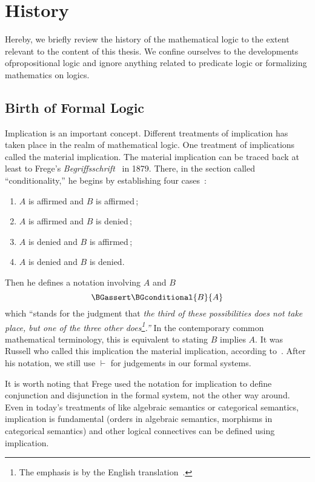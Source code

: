 



\section{History}

Hereby, we briefly review the history of the mathematical logic to the
extent relevant to the content of this thesis.
We confine ourselves to the developments ofpropositional logic and
ignore anything related to predicate logic or formalizing mathematics on
logics.

\subsection{Birth of Formal Logic}

Implication is an important concept.
Different treatments of implication has taken place in the realm of
mathematical logic.
One treatment of implications called the material implication.
The material implication can be traced back at least to
Frege's \textit{Begriffsschrift}~\citep{frege} in 1879.  There, in the
section called
``conditionality,''
he begins by establishing four cases~\citep[p.~13]{frege}:
\begin{enumerate}
 \item $A$ is affirmed and $B$ is affirmed\,;
 \item $A$ is affirmed and $B$ is denied\,;
 \item $A$ is denied and $B$ is affirmed\,;
 \item $A$ is denied and $B$ is denied.
\end{enumerate}
Then he defines a notation involving $A$ and $B$
\[
\BGassert\BGconditional{B}{A}
\]
which ``stands for the
judgment that \textit{the third of these possibilities does not take
place, but one of the three other does\footnote{The emphasis is by
the English translation~\citep[p.~14]{frege}.}.''}
In the contemporary common mathematical terminology, this is equivalent
to stating $B$ implies $A$.
It was Russell who called this implication the material implication,
according to~\citet{sep-conditionals}.
After his notation, we still use $\vdash$ for judgements in our formal systems.

It is worth noting that Frege used the notation for implication to define conjunction and
disjunction in the formal system, not the other way around.  Even in
today's treatments of
like algebraic semantics or categorical semantics, implication is
fundamental (orders in algebraic semantics, morphisms in categorical
semantics) and other logical connectives
can be defined using implication.

